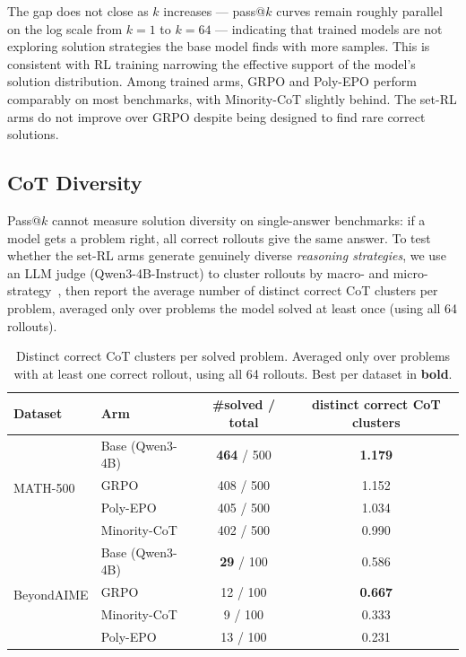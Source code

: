 \documentclass[11pt]{article}
\begin{document}
The gap does not close as $k$ increases --- pass@$k$ curves remain roughly
parallel on the log scale from $k{=}1$ to $k{=}64$ --- indicating that trained
models are not exploring solution strategies the base model finds with more
samples. This is consistent with RL training narrowing the effective support of
the model's solution distribution. Among trained arms, GRPO and Poly-EPO
perform comparably on most benchmarks, with Minority-CoT slightly behind. The
set-RL arms do not improve over GRPO despite being designed to find rare correct
solutions.

\subsection{CoT Diversity}
\label{sec:results:cot}

Pass@$k$ cannot measure solution diversity on single-answer benchmarks: if a
model gets a problem right, all correct rollouts give the same answer. To test
whether the set-RL arms generate genuinely diverse \emph{reasoning strategies},
we use an LLM judge (Qwen3-4B-Instruct) to cluster rollouts by macro- and
micro-strategy~\citep{polyepo}, then report the average number of distinct
correct CoT clusters per problem, averaged only over problems the model solved
at least once (using all 64 rollouts).

\begin{table}[h]
\centering
\caption{Distinct correct CoT clusters per solved problem. Averaged only over
problems with at least one correct rollout, using all 64 rollouts. Best per
dataset in \textbf{bold}.}
\label{tab:cot}
\small
\setlength{\tabcolsep}{8pt}
\begin{tabular}{llcc}
\toprule
\textbf{Dataset} & \textbf{Arm} & \textbf{\#solved / total} & \textbf{distinct correct CoT clusters} \\
\midrule
\multirow{4}{*}{MATH-500}
  & Base (Qwen3-4B) & \textbf{464} / 500 & \textbf{1.179} \\
  & GRPO            & 408 / 500 & 1.152 \\
  & Poly-EPO        & 405 / 500 & 1.034 \\
  & Minority-CoT    & 402 / 500 & 0.990 \\
\midrule
\multirow{4}{*}{BeyondAIME}
  & Base (Qwen3-4B) & \textbf{29} / 100 & 0.586 \\
  & GRPO            & 12 / 100 & \textbf{0.667} \\
  & Minority-CoT    & 9 / 100  & 0.333 \\
  & Poly-EPO        & 13 / 100 & 0.231 \\
\bottomrule
\end{tabular}
\end{table}
\end{document}
